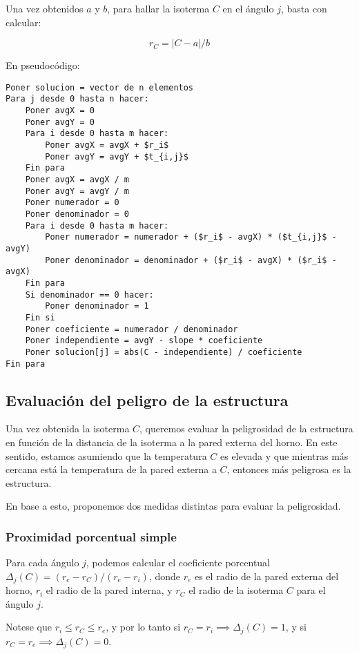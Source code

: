 Una vez obtenidos $a$ y $b$, para hallar la isoterma $C$ en el ángulo $j$, basta con calcular:

$$r_C = |C - a|/b$$

En pseudocódigo:

\begin{lstlisting}[mathescape=true]
Poner solucion = vector de n elementos
Para j desde 0 hasta n hacer:
    Poner avgX = 0
    Poner avgY = 0
    Para i desde 0 hasta m hacer:
        Poner avgX = avgX + $r_i$
        Poner avgY = avgY + $t_{i,j}$
    Fin para
    Poner avgX = avgX / m
    Poner avgY = avgY / m
    Poner numerador = 0
    Poner denominador = 0
    Para i desde 0 hasta m hacer:
        Poner numerador = numerador + ($r_i$ - avgX) * ($t_{i,j}$ - avgY)
        Poner denominador = denominador + ($r_i$ - avgX) * ($r_i$ - avgX)
    Fin para
    Si denominador == 0 hacer:
        Poner denominador = 1
    Fin si
    Poner coeficiente = numerador / denominador
    Poner independiente = avgY - slope * coeficiente
    Poner solucion[j] = abs(C - independiente) / coeficiente
Fin para
\end{lstlisting}

\subsection{Evaluación del peligro de la estructura}

Una vez obtenida la isoterma $C$, queremos evaluar la peligrosidad de la estructura en función de la distancia de la isoterma a la pared externa del horno. En este sentido, estamos asumiendo que la temperatura $C$ es elevada y que mientras más cercana está la temperatura de la pared externa a $C$, entonces más peligrosa es la estructura.

En base a esto, proponemos dos medidas distintas para evaluar la peligrosidad.

\subsubsection{Proximidad porcentual simple}

Para cada ángulo $j$, podemos calcular el coeficiente porcentual $\Delta_j(C) = (r_e - r_C)/(r_e - r_i)$, donde $r_e$ es el radio de la pared externa del horno, $r_i$ el radio de la pared interna, y $r_C$ el radio de la isoterma $C$ para el ángulo $j$.

Notese que $r_i \leq r_C \leq r_e$, y por lo tanto si $r_C = r_i \implies \Delta_j(C) = 1$, y si $r_C = r_e \implies \Delta_j(C) = 0$.

